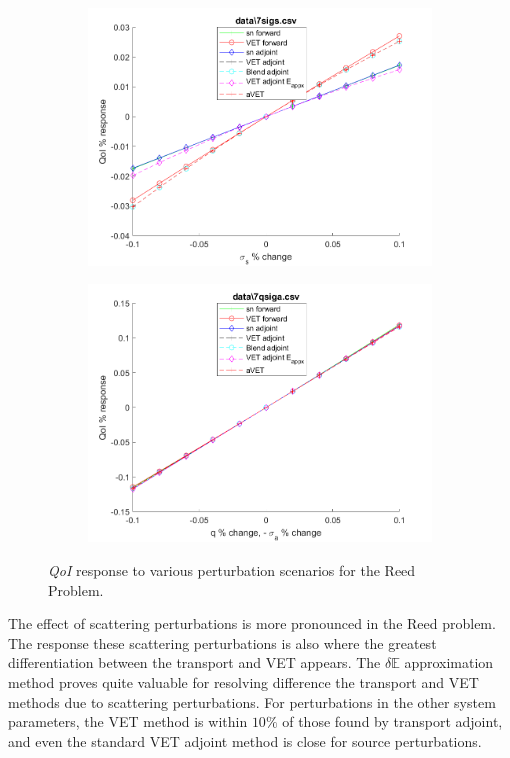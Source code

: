 \documentclass[12pt]{report}
\newcommand{\Edd}{\mathbb{E}}
\newcommand{\qoi}{{\it QoI}\xspace}
\begin{document}
\begin{figure}[H]
\begin{subfigure}{.5\textwidth}
  \includegraphics[width=.98\linewidth]{figures2/7sigsSens.png}
\end{subfigure}%
\begin{subfigure}{.5\textwidth}
  \centering
  \includegraphics[width=.98\linewidth]{figures2/7qsigaSens.png}
\end{subfigure}
\caption{\qoi response to various perturbation scenarios for the Reed Problem.}
\end{figure}

The effect of scattering perturbations is more pronounced in the Reed problem. The response these scattering perturbations is also where the greatest differentiation between the transport and VET appears. The $\delta \Edd$ approximation method proves quite valuable for resolving difference the transport and VET methods due to scattering perturbations. For perturbations in the other system parameters, the VET method is within $10\%$ of those found by transport adjoint, and even the standard VET adjoint method is close for source perturbations.
\end{document}
